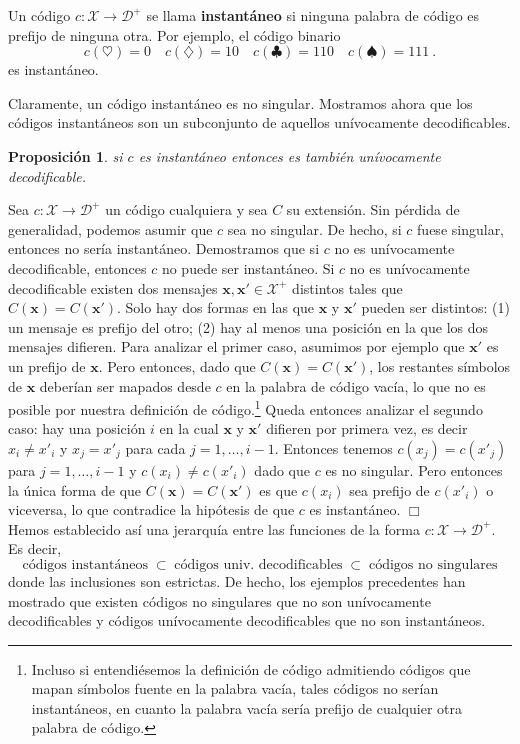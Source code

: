 \documentclass[11pt]{article}
\newtheorem{fact}[theorem]{Proposición}
\newenvironment{proof}{{\textsc{Demostración.}\ }}{\hfill$\Box$\\[2mm]}
\newcommand{\bx}{ \boldsymbol{x} }
\newcommand{\scD}{\mathcal{D}}
\newcommand{\scX}{\mathcal{X}}
\begin{document}
Un código $c : \scX \to \scD^+$ se llama \textbf{instantáneo} si ninguna palabra de código es prefijo de ninguna otra. Por ejemplo, el código binario
\[
    c(\heartsuit) = 0 \quad c(\diamondsuit) = 10 \quad c(\clubsuit) = 110 \quad c(\spadesuit) = 111~.
\]
es instantáneo.

Claramente, un código instantáneo es no singular. Mostramos ahora que los códigos instantáneos son un subconjunto de aquellos unívocamente decodificables.
%
\begin{fact}
si $c$ es instantáneo entonces es también unívocamente decodificable.
\end{fact}
%
\begin{proof}
Sea $c : \scX\to\scD^+$ un código cualquiera y sea $C$ su extensión. Sin pérdida de generalidad, podemos asumir que $c$ sea no singular. De hecho, si $c$ fuese singular, entonces no sería instantáneo. Demostramos que si $c$ no es unívocamente decodificable, entonces $c$ no puede ser instantáneo. Si $c$ no es unívocamente decodificable existen dos mensajes $\bx,\bx'\in\scX^+$ distintos tales que $C(\bx) = C(\bx')$. Solo hay dos formas en las que $\bx$ y $\bx'$ pueden ser distintos: (1) un mensaje es prefijo del otro; (2) hay al menos una posición en la que los dos mensajes difieren. Para analizar el primer caso, asumimos por ejemplo que $\bx'$ es un prefijo de $\bx$. Pero entonces, dado que $C(\bx) = C(\bx')$, los restantes símbolos de $\bx$ deberían ser mapados desde $c$ en la palabra de código vacía, lo que no es posible por nuestra definición de código.\footnote{Incluso si entendiésemos la definición de código admitiendo códigos que mapan símbolos fuente en la palabra vacía, tales códigos no serían instantáneos, en cuanto la palabra vacía sería prefijo de cualquier otra palabra de código.} Queda entonces analizar el segundo caso: hay una posición $i$ en la cual $\bx$ y $\bx'$ difieren por primera vez, es decir $x_i \neq x'_i$ y $x_j = x'_j$ para cada $j = 1,\dots,i-1$. Entonces tenemos $c(x_j)=c(x'_j)$ para $j=1,\dots,i-1$ y $c(x_i) \neq c(x'_i)$ dado que $c$ es no singular. Pero entonces la única forma de que $C(\bx) = C(\bx')$ es que $c(x_i)$ sea prefijo de $c(x'_i)$ o viceversa, lo que contradice la hipótesis de que $c$ es instantáneo.
\end{proof}
%
Hemos establecido así una jerarquía entre las funciones de la forma $c:\scX\to\scD^+$. Es decir,
\[
    \text{códigos instantáneos} \;\subset\; \text{códigos univ.\ decodificables} \;\subset\; \text{códigos no singulares}
\]
donde las inclusiones son estrictas. De hecho, los ejemplos precedentes han mostrado que existen códigos no singulares que no son unívocamente decodificables y códigos unívocamente decodificables que no son instantáneos.
\end{document}
